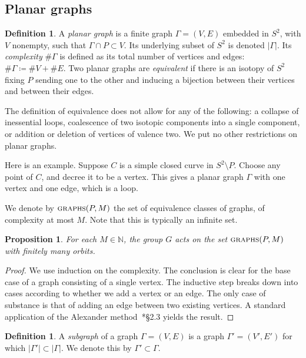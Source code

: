 \documentclass{amsart}
\newcommand\N{{\mathbb{N}}}
\newtheorem{prop}[thm]{Proposition}
\theoremstyle{definition}
\newtheorem{defn}[thm]{Definition}
\theoremstyle{remark}
\newcommand{\graphs}{\text{\sc{graphs}}}
\begin{document}
\subsection{Planar graphs} 
\begin{defn}\label{def:essentialgraph}
  A \emph{planar graph} is a finite graph $\Gamma=(V,E)$ embedded in $S^2$, with $V$ nonempty, such that $\Gamma \cap P \subset V$. Its underlying subset of $S^2$ is denoted $|\Gamma|$.  Its \emph{complexity} $\#\Gamma$ is defined as its total number of vertices and edges: $\#\Gamma\coloneqq\#V+\#E$.   Two planar graphs are \emph{equivalent} if there is an isotopy of $S^2$ fixing $P$ sending one to the other and inducing a bijection between their vertices and between their edges. 
\end{defn}
The definition of equivalence does not allow for any of the following: a collapse of inessential loops, coalescence of two isotopic components into a single component, or addition or deletion of vertices of valence two. We put no other restrictions on planar graphs.  

Here is an example. Suppose $C$ is a simple closed curve in $S^2\setminus P$.  Choose any point of $C$, and decree it to be a vertex.  This gives a planar graph $\Gamma$ with one vertex and one edge, which is a loop. 

We denote by $\graphs(P,M)$ the set of equivalence classes of graphs, of complexity at most $M$. Note that this is typically an infinite set. 

\begin{prop}\label{prop:gorb}
For each $M\in \N$, the group $G$ acts on the set $\graphs(P,M)$  with finitely many orbits. 
\end{prop}

\begin{proof} We use induction on the complexity.  The conclusion is clear for the base case of a graph consisting of a single vertex. The inductive step breaks down into cases according to whether we add a vertex or an edge.  The only case of substance is that of adding an edge between two existing vertices. A standard application of the Alexander method~\cite{farb:margalit:mcg}*{\S2.3} yields the result.
\end{proof}

\begin{defn}\label{subgraphs}
A \emph{subgraph} of a graph $\Gamma=(V,E)$ is a graph $\Gamma' = (V', E')$ for which $|\Gamma'| \subset |\Gamma|$.  We denote this by $\Gamma' \subset \Gamma$.
\end{defn}
\end{document}
